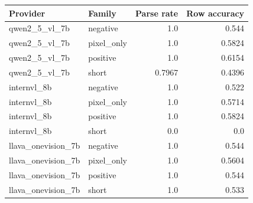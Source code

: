 \begin{tabular}{llrr}
\toprule
Provider & Family & Parse rate & Row accuracy \\
\midrule
qwen2\_5\_vl\_7b & negative & 1.0 & 0.544 \\
qwen2\_5\_vl\_7b & pixel\_only & 1.0 & 0.5824 \\
qwen2\_5\_vl\_7b & positive & 1.0 & 0.6154 \\
qwen2\_5\_vl\_7b & short & 0.7967 & 0.4396 \\
internvl\_8b & negative & 1.0 & 0.522 \\
internvl\_8b & pixel\_only & 1.0 & 0.5714 \\
internvl\_8b & positive & 1.0 & 0.5824 \\
internvl\_8b & short & 0.0 & 0.0 \\
llava\_onevision\_7b & negative & 1.0 & 0.544 \\
llava\_onevision\_7b & pixel\_only & 1.0 & 0.5604 \\
llava\_onevision\_7b & positive & 1.0 & 0.544 \\
llava\_onevision\_7b & short & 1.0 & 0.533 \\
\bottomrule
\end{tabular}
